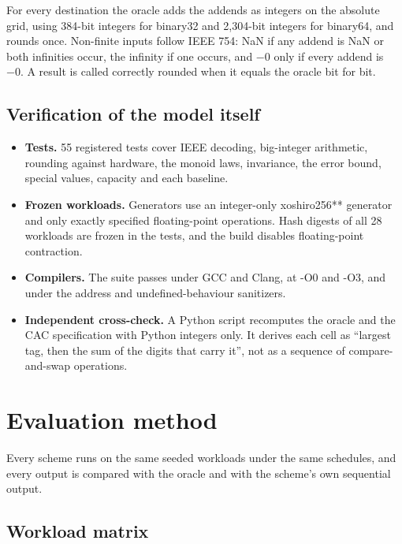 \documentclass[journal]{IEEEtran}
\begin{document}
For every destination the oracle adds the addends as integers on the
absolute grid, using 384-bit integers for binary32 and 2,304-bit
integers for binary64, and rounds once. Non-finite inputs follow IEEE
754: NaN if any addend is NaN or both infinities occur, the infinity if
one occurs, and −0 only if every addend is −0. A result is called
correctly rounded when it equals the oracle bit for bit.

\hypertarget{verification-of-the-model-itself}{%
\subsection{Verification of the model
itself}\label{verification-of-the-model-itself}}

\begin{itemize}
\item
  \textbf{Tests.} 55 registered tests cover IEEE decoding, big-integer
  arithmetic, rounding against hardware, the monoid laws, invariance,
  the error bound, special values, capacity and each baseline.
\item
  \textbf{Frozen workloads.} Generators use an integer-only xoshiro256**
  generator and only exactly specified floating-point operations. Hash
  digests of all 28 workloads are frozen in the tests, and the build
  disables floating-point contraction.
\item
  \textbf{Compilers.} The suite passes under GCC and Clang, at -O0 and
  -O3, and under the address and undefined-behaviour sanitizers.
\item
  \textbf{Independent cross-check.} A Python script recomputes the
  oracle and the CAC specification with Python integers only. It derives
  each cell as ``largest tag, then the sum of the digits that carry
  it'', not as a sequence of compare-and-swap operations.
\end{itemize}

\hypertarget{evaluation-method}{%
\section{Evaluation method}\label{evaluation-method}}

Every scheme runs on the same seeded workloads under the same schedules,
and every output is compared with the oracle and with the scheme's own
sequential output.

\hypertarget{workload-matrix}{%
\subsection{Workload matrix}\label{workload-matrix}}
\end{document}
